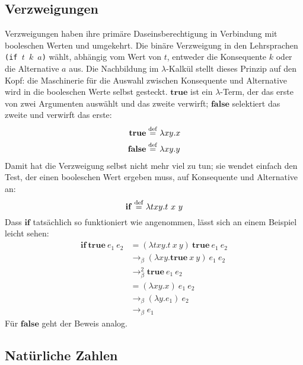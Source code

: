 \subsection{Verzweigungen}
\label{sec:booleans}
%
Verzweigungen haben ihre primäre Daseinsberechtigung in Verbindung mit
booleschen Werten und umgekehrt.
Die binäre Verzweigung in den Lehrsprachen
\texttt{(if \(t\) \(k\) \(a\))}
wählt, abhängig vom Wert von $t$,
entweder die Konsequente $k$ oder die Alternative $a$ aus.  Die Nachbildung im
$\lambda$-Kalkül stellt dieses Prinzip auf den Kopf: die Maschinerie
für die Auswahl zwischen Konsequente und Alternative wird in die
booleschen Werte selbst gesteckt.  $\mathbf{true}$ ist ein
$\lambda$-Term, der das erste von zwei Argumenten auswählt und das
zweite verwirft; $\mathbf{false}$ selektiert das zweite und verwirft
das erste:
%
\begin{align*}
  \mathbf{true} & \stackrel{\rm def}{=}{} \lambda x y.x \\
  \mathbf{false} & \stackrel{\rm def}{=}{} \lambda x y.y
\end{align*}
%
Damit hat die Verzweigung selbst nicht mehr viel zu tun; sie wendet
einfach den Test, der einen booleschen Wert ergeben muss, auf
Konsequente und Alternative an:
%
\begin{displaymath}
  \mathbf{if} \stackrel{\rm def}{=}{} \lambda t x y.t~x~y
\end{displaymath}
%
Dass $\mathbf{if}$ tatsächlich so funktioniert wie angenommen, lässt
sich an einem Beispiel leicht sehen:
%
\begin{displaymath}
  \begin{split}
    \mathbf{if}~\mathbf{true}~e_1~e_2 & =
    (\lambda t x y.t~x~y)~\mathbf{true}~e_1~e_2
    \\
    & \rightarrow_\beta (\lambda x y.\mathbf{true}~x~y)~e_1~e_2\\
    & \rightarrow_\beta^2 \mathbf{true}~e_1~e_2\\
    & = (\lambda x y.x)~e_1~e_2\\
    & \rightarrow_\beta (\lambda y.e_1)~e_2\\
    & \rightarrow_\beta e_1  \end{split}
\end{displaymath}
%
Für $\mathbf{false}$ geht der Beweis analog.

\subsection{Natürliche Zahlen}

